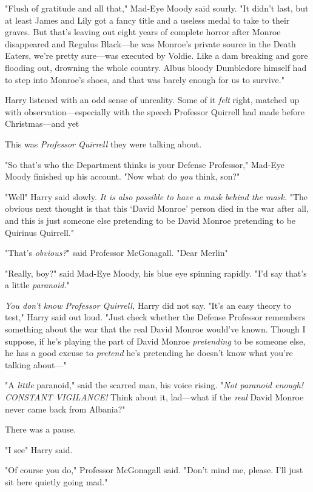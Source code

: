 "Flush of gratitude and all that," Mad-Eye Moody said sourly. "It didn't last,
but at least James and Lily got a fancy title and a useless medal to take to
their graves. But that's leaving out eight years of complete horror after
Monroe disappeared and Regulus Black—he was Monroe's private source in the
Death Eaters, we're pretty sure—was executed by Voldie. Like a dam breaking
and gore flooding out, drowning the whole country. Albus bloody Dumbledore
himself had to step into Monroe's shoes, and that was barely enough for us to
survive."

Harry listened with an odd sense of unreality. Some of it \emph{felt} right,
matched up with observation—especially with the speech Professor Quirrell had
made before Christmas—and yet{\el}

This was \emph{Professor Quirrell} they were talking about.

"So that's who the Department thinks is your Defense Professor," Mad-Eye Moody
finished up his account. "Now what do \emph{you} think, son?"

"Well{\el}" Harry said slowly. \emph{It is also possible to have a mask
behind the mask.} "The obvious next thought is that this `David Monroe' person
died in the war after all, and this is just someone else pretending to be David
Monroe pretending to be Quirinus Quirrell."

"That's \emph{obvious?}" said Professor McGonagall. "Dear Merlin{\el}"

"Really, boy?" said Mad-Eye Moody, his blue eye spinning rapidly. "I'd say
that's a little{\el} \emph{paranoid.}"

\emph{You don't know Professor Quirrell,} Harry did not say. "It's an easy
theory to test," Harry said out loud. "Just check whether the Defense Professor
remembers something about the war that the real David Monroe would've known.
Though I suppose, if he's playing the part of David Monroe \emph{pretending} to
be someone else, he has a good excuse to \emph{pretend} he's pretending he
doesn't know what you're talking about—"

"A \emph{little} paranoid," said the scarred man, his voice rising. "\emph{Not
paranoid enough! CONSTANT VIGILANCE!} Think about it, lad—what if the
\emph{real} David Monroe never came back from Albania?"

There was a pause.

"I see{\el}" Harry said.

"Of course you do," Professor McGonagall said. "Don't mind me, please. I'll
just sit here quietly going mad."

